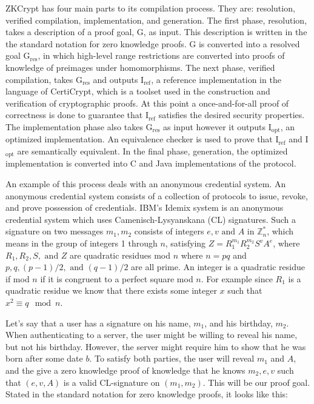 \documentclass{sig-alternate}
\begin{document}
		ZKCrypt has four main parts to its compilation process. They are: resolution, verified
		compilation, implementation, and generation. The first phase, resolution, takes a
		description of a proof goal, G, as input. This description is written in the the standard
		notation for zero knowledge proofs. G is converted into a resolved goal
		G$_{\textrm{res}}$, in which
		high-level range restrictions are converted into proofs of knowledge of preimages under
		homomorphisms. The next phase, verified compilation, takes G$_{\textrm{res}}$ and 
		outputs I$_{\textrm{ref}}$,
		a reference implementation in the language of CertiCrypt, which is a toolset used in
		the construction and verification of cryptographic proofs. At this point a 
		once-and-for-all proof of correctness is done to guarantee that I$_{\textrm{ref}}$
		satisfies the desired security properties. The implementation phase
		also takes G$_{\textrm{res}}$ as input however it outputs I$_{\textrm{opt}}$, an
		optimized implementation. An equivalence checker is used to prove that I$_{\textrm{ref}}$
		and I$_{\textrm{opt}}$ are semantically equivalent. In the final phase, generation,
		the optimized implementation is converted into C and Java implementations of the
		protocol.
		
		An example of this process deals with an anonymous credential system. An anonymous
		credential system consists of a collection of protocols to issue, revoke, and prove
		possession of credentials. IBM's Idemix system is an anonymous credential system
		which uses Camenisch-Lysyanskana (CL) signatures. Such a signature on two messages 
		$m_{1}, m_{2}$ consists of integers $e, v \text{ and } A$ in $\mathbb{Z}^{*}_{n}$,
		which means in the group of integers 1 through $n$, satisfying
		$Z = R^{m_{1}}_{1}R^{m_{2}}_{2}S^{v}A^{e}$, where $R_{1}, R_{2}, S, \text{ and } Z$
		are quadratic residues mod $n$ where $n = pq$ and $p, q, (p-1)/2, \text{ and }
		(q-1)/2$ are all prime. An integer is a quadratic residue if mod $n$ if it is
		congruent to a perfect square mod $n$. For example since $R_{1}$ is a quadratic
		residue we know that there exists some integer $x$ such that $x^{2} \equiv q \mod n$.
		
		Let's say that a user has a signature on his name, $m_{1}$, and his birthday,
		$m_{2}$. When authenticating to a server, the user might be willing to reveal 
		his name, but not his birthday. However, the server might require him to show that 
		he was born	after some date $b$. To satisfy both parties, the user will reveal
		$m_{1}$ and $A$, and the give a zero knowledge proof of knowledge that he knows
		$m_{2}, e, v$ such that $(e, v, A)$ is a valid CL-signature on $(m_{1}, m_{2})$.
		This will be our proof goal. Stated in the standard notation for zero knowledge
		proofs, it looks like this:
		
\end{document}
